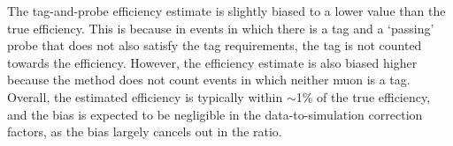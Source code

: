 The tag-and-probe efficiency estimate is slightly biased to a lower value than 
the true efficiency. This is because in events in which there is a tag and a 
`passing' probe that does not also satisfy the tag requirements, the tag is not 
counted towards the efficiency. 
However, the efficiency estimate is also biased 
higher because the method does not count events in which neither muon is a tag. 
Overall, the estimated efficiency is typically within $\sim$1\% 
of the true efficiency, and the bias is expected to be negligible in the 
data-to-simulation correction factors, as the bias largely cancels out in the 
ratio.

